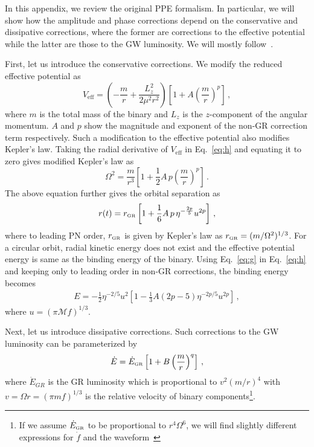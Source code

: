 \documentclass[prd,twocolumn,nofootinbib]{revtex4-1}
\newcommand{\GR}{{\mbox{\tiny GR}}}
\begin{document}
In this appendix, we review the original PPE formalism. In particular, we will show how the amplitude and phase corrections depend on the conservative and dissipative corrections, where the former are corrections to the effective potential while the latter are those to the GW luminosity. We will mostly follow~\cite{Chatziioannou:2012rf}.

First, let us introduce the conservative corrections. We modify the reduced effective potential as
 \begin{equation}\label{eq:h}
 V_{\text{eff}}=\left(-\frac{m}{r}+\frac{{L}^2_{z}}{2\mu^2r^2}\right)\left[1+A \left(\frac{m}{r}\right)^p\right]\,,
 \end{equation}
where $m$ is the total mass of the binary and $L_{z}$ is the $z$-component of the angular momentum. $A$ and $p$ show the magnitude and exponent of the non-GR correction term respectively. Such a modification to the effective potential also modifies Kepler's law. Taking the radial derivative of $V_{\text{eff}}$ in Eq.~\eqref{eq:h} and equating it to zero gives modified Kepler's law as
 \begin{equation}
 \Omega^2=\frac{m}{r^3} \left[1+\frac{1}{2} A \, p\left(\frac{m}{r}\right)^p\right]\,.
 \end{equation}
 The above equation further gives the orbital separation as
 \begin{equation}\label{eq:g}
 r(t)=r_{\GR}\left[1+\frac{1}{6}A\, p\, \eta^{-\frac{2p}{5}}u^{2p}\right]\,,
 \end{equation}
where to leading PN order, $r_{\GR}$ is given by Kepler's law as $r_{\GR}=(m/\Omega^2)^{1/3}$. For a circular orbit, radial kinetic energy does not exist and the effective potential energy is same as the binding energy of the binary. Using Eq.~\eqref{eq:g} in Eq.~\eqref{eq:h} and keeping only to leading order in non-GR corrections, the binding energy becomes
\begin{align}\label{eq:j}
E=-\frac{1}{2}\eta^{-2/5}u^2\left[1-\frac{1}{3}A(2p-5)\eta^{-2p/5}u^{2p}\right]\,,
\end{align}
where $u=(\pi \mathcal{M} f)^{1/3}$.

Next, let us introduce dissipative corrections. Such corrections to the GW luminosity can be parameterized by
 \begin{equation}\label{eq:a}
 \dot{E}=\dot{E}_{\GR}\left[1+B\left(\frac{m}{r}\right)^q\right]\,,
 \end{equation}
 where $\dot{E}_{GR}$ is the GR luminosity which is proportional to $v^2(m/r)^4$ with $v=\Omega r = (\pi m f)^{1/3}$ is the relative velocity of binary components\footnote{If we assume $\dot{E}_{\GR}$ to be proportional to $r^4\Omega^6$, we will find slightly different expressions for $\dot{f}$ and the waveform~\cite{Chatziioannou:2012rf}}. 
 
\end{document}
